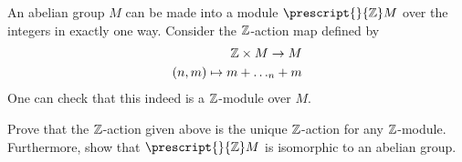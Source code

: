 \documentclass{memoir}
\begin{document}
\begin{exmp}[\(\Z\)-Modules]
An abelian group \(M\) can be made into a module \(\prescript{}{\Z}M\) over the integers in exactly one way. Consider the \(\Z\)-action map defined by
\begin{align*}
	\mathbb{Z}\times M \to M\\
	(n,m) \mapsto  m + \ldots_{n} + m
\end{align*}
One can check that this indeed is a \(\Z\)-module over \(M\). 
\end{exmp}

\begin{hw}
	Prove that the \(\Z\)-action given above is the unique \(\Z\)-action for any \(\Z\)-module. Furthermore, show that \(\prescript{}{\Z}M\) is isomorphic to an abelian group.
\end{hw}
\end{document}
